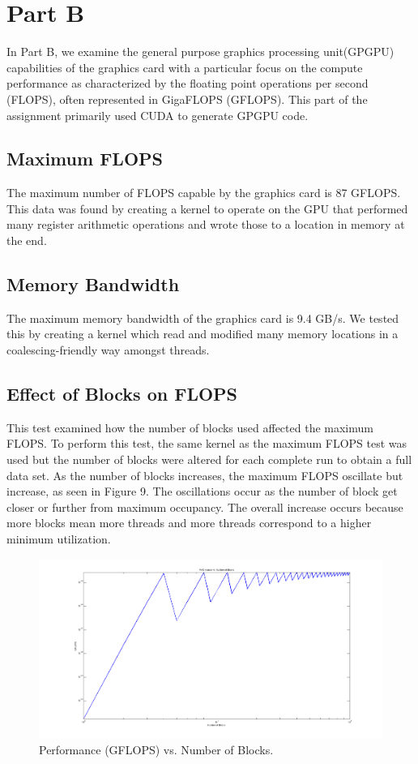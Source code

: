\documentclass[12pt] {article}
\begin{document}
\clearpage
\newpage
\section{Part B}
In Part B, we examine the general purpose graphics processing unit(GPGPU) capabilities of the graphics card with a particular focus on the compute performance as characterized by the floating point operations per second (FLOPS), often represented in GigaFLOPS (GFLOPS). This part of the assignment primarily used CUDA to generate GPGPU code.


\subsection{Maximum FLOPS}
The maximum number of FLOPS capable by the graphics card is 87 GFLOPS. This data was found by creating a kernel to operate on the GPU that performed many register arithmetic operations and wrote those to a location in memory at the end.


\subsection{Memory Bandwidth}
The maximum memory bandwidth of the graphics card is 9.4 GB/s. We tested this by creating a kernel which read and modified many memory locations in a coalescing-friendly way amongst threads.

\newpage
\subsection{Effect of Blocks on FLOPS}
This test examined how the number of blocks used affected the maximum FLOPS. To perform this test, the same kernel as the maximum FLOPS test was used but the number of blocks were altered for each complete run to obtain a full data set. As the number of blocks increases, the maximum FLOPS oscillate but increase, as seen in Figure 9. The oscillations occur as the number of block get closer or further from maximum occupancy. The overall increase occurs because more blocks mean more threads and more threads correspond to a higher minimum utilization.  


\begin{figure}[ht!]
	\centering
	\includegraphics[width=5in]{figures/blocks_v_perf.png}
	\caption{Performance (GFLOPS) vs. Number of Blocks.}
\end{figure}
\FloatBarrier
\end{document}
